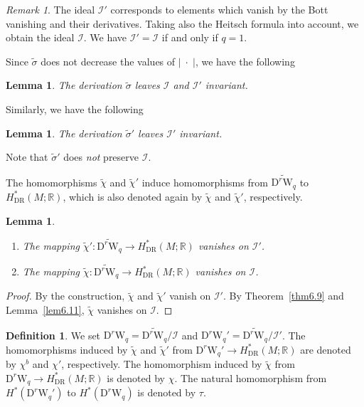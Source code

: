 \documentclass[12pt]{amsart}
\newcommand{\R}{{\mathbb R}}
\newcommand{\W}{\mathrm{W}}
\newcommand{\D}{\mathrm{D}}
\newcommand{\norm}[1]{\lvert#1\rvert}
\newtheorem{lemma}[theorem]{Lemma}
\theoremstyle{definition}
\newtheorem{definition}[theorem]{Definition}
\theoremstyle{remark}
\newtheorem{remark}[theorem]{Remark}
\begin{document}
\begin{remark}
The ideal $\mathscr{I}'$ corresponds to elements which vanish by the Bott vanishing and their derivatives.
Taking also the Heitsch formula into account, we obtain the ideal $\mathscr{I}$.
We have $\mathscr{I}'=\mathscr{I}$ if and only if $q=1$.
\end{remark}

Since $\widetilde\sigma$ does not decrease the values of $\norm{\;\cdot\;}$, we have the following

\begin{lemma}
The derivation $\widetilde\sigma$ leaves $\mathscr{I}$ and $\mathscr{I}'$ invariant.
\end{lemma}

Similarly, we have the following

\begin{lemma}
\label{lem6.9__}
The derivation $\widetilde\sigma'$ leaves $\mathscr{I}'$ invariant.
\end{lemma}

Note that $\widetilde\sigma'$ does \textit{not} preserve $\mathscr{I}$.

The homomorphisms $\widetilde\chi$ and $\widetilde\chi'$ induce homomorphisms from $\widetilde{\D^r\W_q}$ to $H_{\mathrm{DR}}^*(M;\R)$, which is also denoted again by $\widetilde\chi$ and $\widetilde\chi'$, respectively.

\begin{lemma}
\label{lem7.14}
\begin{enumerate}[label=\textup{\arabic*)}]
\item
The mapping $\widetilde\chi'\colon\widetilde{\D^r\W_q}\to H_{\mathrm{DR}}^*(M;\R)$ vanishes on $\mathscr{I}'$.
\item
The mapping $\widetilde\chi\colon\widetilde{\D^r\W_q}\to H_{\mathrm{DR}}^*(M;\R)$ vanishes on $\mathscr{I}$.
\end{enumerate}
\end{lemma}
\begin{proof}
By the construction, $\widetilde\chi$ and $\widetilde\chi'$ vanish on $\mathscr{I}'$.
By Theorem~\ref{thm6.9} and Lemma~\ref{lem6.11}, $\widetilde\chi$ vanishes on $\mathscr{I}$.
\end{proof}

\begin{definition}
We set
$\D^r\W_q=\widetilde{\D^r\W_q}/\mathscr{I}$ and $\D^r\W_q'=\widetilde{\D^r\W_q}/\mathscr{I}'$.
The homomorphisms induced by $\widetilde\chi$ and $\widetilde\chi'$ from $\D^r\W_q'\to H_{\mathrm{DR}}^*(M;\R)$ are denoted by $\chi^b$ and $\chi'$, respectively.
The homomorphism induced by $\widetilde\chi$ from $\D^r\W_q\to H_{\mathrm{DR}}^*(M;\R)$ is denoted by $\chi$.
The natural homomorphism from $H^*(\D^r\W_q')$ to $H^*(\D^r\W_q)$ is denoted by $\tau$.
\end{definition}
\end{document}
